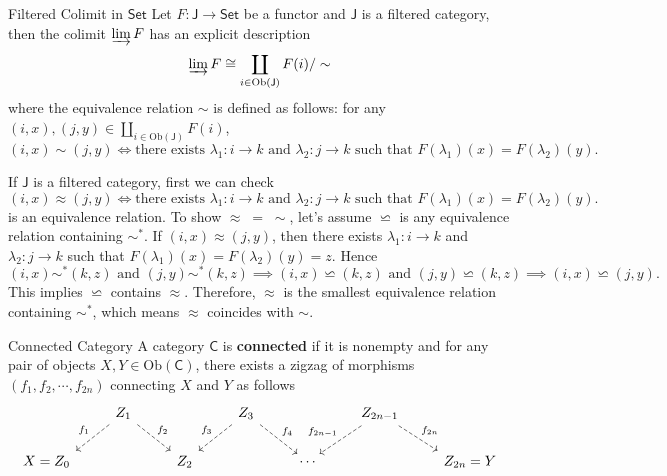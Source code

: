 \begin{example}{Filtered Colimit in $\mathsf{Set}$}{}
    Let $F:\mathsf{J}\to \mathsf{Set}$ be a functor and $\mathsf{J}$ is a filtered category, then 
    the colimit $\varinjlim F$ has an explicit description
    \begin{align*}
        \varinjlim F\cong\coprod_{i\in \mathrm{Ob}(\mathsf{J})}F(i)/\sim  
    \end{align*}
    where the equivalence relation $\sim$ is defined as follows: for any $(i,x),(j,y)\in \coprod\limits_{i\in \mathrm{Ob}(\mathsf{J})}F(i)$,
    \[
        (i,x)\sim (j,y)\iff \text{there exists }\lambda_1:i\to k\text{ and }\lambda_2:j\to k\text{ such that }F(\lambda_1)(x)=F(\lambda_2)(y).
    \]
\end{example}
\begin{prf} 
    If $\mathsf{J}$ is a filtered category, first we can check 
    \[
        (i,x)\approx (j,y)\iff \text{there exists }\lambda_1:i\to k\text{ and }\lambda_2:j\to k\text{ such that }F(\lambda_1)(x)=F(\lambda_2)(y).
    \]
    is an equivalence relation. To show $\approx\;=\;\sim$, let's assume $\backsimeq$ is any equivalence relation containing $\sim^*$. If $(i,x)\approx(j,y)$, then there exists $\lambda_1:i\to k$ and $\lambda_2:j\to k$ such that $F(\lambda_1)(x)=F(\lambda_2)(y)=z$. Hence 
    \[
        (i,x)\sim^* (k,z)\text{ and }(j,y)\sim^* (k,z)\implies(i,x)\backsimeq (k,z)\text{ and }(j,y)\backsimeq (k,z)\implies (i,x)\backsimeq (j,y).
    \]
    This implies $\backsimeq$ contains $\approx$. Therefore, $\approx$ is the smallest equivalence relation containing $\sim^*$, which means $\approx$ coincides with $\sim$.
\end{prf}
\begin{definition}{Connected Category}{}
    A category $\mathsf{C}$ is \textbf{connected} if it is nonempty and for any pair of objects $X,Y\in \mathrm{Ob}(\mathsf{C})$, there exists a zigzag of morphisms $(f_1,f_2,\cdots,f_{2n})$ connecting $X$ and $Y$ as follows
\[
    \begin{tikzcd}[ampersand replacement=\&]
            \&  [-3em]   \& Z_1 \arrow[ld, "f_1"', dashed] \arrow[rd, "f_2", dashed] \&     \& Z_3 \arrow[ld, "f_3"', dashed] \arrow[rd, "f_4", dashed] \&        \& Z_{2n-1} \arrow[ld, "f_{2n-1}"', dashed] \arrow[rd, "f_{2n}", dashed] \&        \&  [-3em]   \\
         X= \& Z_0 \&                                          \& Z_2 \&                                          \& \cdots \&                                                       \& Z_{2n} \& =Y
         \end{tikzcd}
         \]

\end{definition}

